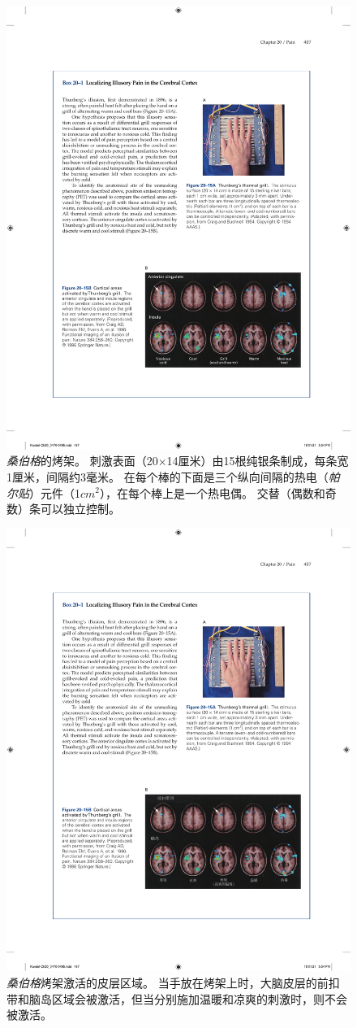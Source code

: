 \begin{figure}[htbp]
	\centering
	\includegraphics[width=0.7\linewidth]{chap20/fig_20_15_a}
	\caption{\textit{桑伯格}的烤架。
		刺激表面（20×14厘米）由15根纯银条制成，每条宽1厘米，间隔约3毫米。
		在每个棒的下面是三个纵向间隔的热电（\textit{帕尔贴}）元件（1$ cm^2 $），在每个棒上是一个热电偶。
		交替（偶数和奇数）条可以独立控制\cite{craig1994thermal}。}
	\label{fig:20_15_a}
\end{figure}


\begin{figure}[htbp]
	\centering
	\includegraphics[width=0.75\linewidth]{chap20/fig_20_15_b}
	\caption{\textit{桑伯格}烤架激活的皮层区域。
		当手放在烤架上时，大脑皮层的前扣带和脑岛区域会被激活，但当分别施加温暖和凉爽的刺激时，则不会被激活。}
	\label{fig:20_15_b}
\end{figure}


